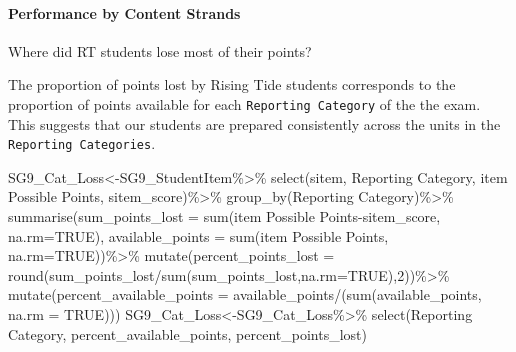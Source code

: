 \documentclass[
  letterpaper,
  DIV=11,
  numbers=noendperiod]{scrartcl}
\let\oldparagraph\paragraph
\renewcommand{\paragraph}[1]{\oldparagraph{#1}\mbox{}}
\newenvironment{Shaded}{\begin{snugshade}}{\end{snugshade}}
\newcommand{\AttributeTok}[1]{\textcolor[rgb]{0.40,0.45,0.13}{#1}}
\newcommand{\ConstantTok}[1]{\textcolor[rgb]{0.56,0.35,0.01}{#1}}
\newcommand{\DecValTok}[1]{\textcolor[rgb]{0.68,0.00,0.00}{#1}}
\newcommand{\FunctionTok}[1]{\textcolor[rgb]{0.28,0.35,0.67}{#1}}
\newcommand{\NormalTok}[1]{\textcolor[rgb]{0.00,0.23,0.31}{#1}}
\newcommand{\OtherTok}[1]{\textcolor[rgb]{0.00,0.23,0.31}{#1}}
\newcommand{\SpecialCharTok}[1]{\textcolor[rgb]{0.37,0.37,0.37}{#1}}
\newcommand{\StringTok}[1]{\textcolor[rgb]{0.13,0.47,0.30}{#1}}
\begin{document}
\hypertarget{performance-by-content-strands}{%
\paragraph{Performance by Content
Strands}\label{performance-by-content-strands}}

Where did RT students lose most of their points?

The proportion of points lost by Rising Tide students corresponds to the
proportion of points available for each \texttt{Reporting\ Category} of
the the exam. This suggests that our students are prepared consistently
across the units in the \texttt{Reporting\ Categories}.

\begin{Shaded}
\begin{Highlighting}[]
\NormalTok{SG9\_Cat\_Loss}\OtherTok{\textless{}{-}}\NormalTok{SG9\_StudentItem}\SpecialCharTok{\%\textgreater{}\%}
  \FunctionTok{select}\NormalTok{(}\StringTok{\textasciigrave{}}\AttributeTok{sitem}\StringTok{\textasciigrave{}}\NormalTok{, }\StringTok{\textasciigrave{}}\AttributeTok{Reporting Category}\StringTok{\textasciigrave{}}\NormalTok{, }\StringTok{\textasciigrave{}}\AttributeTok{item Possible Points}\StringTok{\textasciigrave{}}\NormalTok{, }\StringTok{\textasciigrave{}}\AttributeTok{sitem\_score}\StringTok{\textasciigrave{}}\NormalTok{)}\SpecialCharTok{\%\textgreater{}\%}
  \FunctionTok{group\_by}\NormalTok{(}\StringTok{\textasciigrave{}}\AttributeTok{Reporting Category}\StringTok{\textasciigrave{}}\NormalTok{)}\SpecialCharTok{\%\textgreater{}\%}
  \FunctionTok{summarise}\NormalTok{(}\AttributeTok{sum\_points\_lost =} \FunctionTok{sum}\NormalTok{(}\StringTok{\textasciigrave{}}\AttributeTok{item Possible Points}\StringTok{\textasciigrave{}}\SpecialCharTok{{-}}\StringTok{\textasciigrave{}}\AttributeTok{sitem\_score}\StringTok{\textasciigrave{}}\NormalTok{, }\AttributeTok{na.rm=}\ConstantTok{TRUE}\NormalTok{),}
            \AttributeTok{available\_points =} \FunctionTok{sum}\NormalTok{(}\StringTok{\textasciigrave{}}\AttributeTok{item Possible Points}\StringTok{\textasciigrave{}}\NormalTok{, }\AttributeTok{na.rm=}\ConstantTok{TRUE}\NormalTok{))}\SpecialCharTok{\%\textgreater{}\%}
              \FunctionTok{mutate}\NormalTok{(}\AttributeTok{percent\_points\_lost =} \FunctionTok{round}\NormalTok{(sum\_points\_lost}\SpecialCharTok{/}\FunctionTok{sum}\NormalTok{(sum\_points\_lost,}\AttributeTok{na.rm=}\ConstantTok{TRUE}\NormalTok{),}\DecValTok{2}\NormalTok{))}\SpecialCharTok{\%\textgreater{}\%}
            \FunctionTok{mutate}\NormalTok{(}\AttributeTok{percent\_available\_points =}\NormalTok{ available\_points}\SpecialCharTok{/}\NormalTok{(}\FunctionTok{sum}\NormalTok{(available\_points, }\AttributeTok{na.rm =} \ConstantTok{TRUE}\NormalTok{)))}
\NormalTok{SG9\_Cat\_Loss}\OtherTok{\textless{}{-}}\NormalTok{SG9\_Cat\_Loss}\SpecialCharTok{\%\textgreater{}\%}
  \FunctionTok{select}\NormalTok{(}\StringTok{\textasciigrave{}}\AttributeTok{Reporting Category}\StringTok{\textasciigrave{}}\NormalTok{, }\StringTok{\textasciigrave{}}\AttributeTok{percent\_available\_points}\StringTok{\textasciigrave{}}\NormalTok{, }\StringTok{\textasciigrave{}}\AttributeTok{percent\_points\_lost}\StringTok{\textasciigrave{}}\NormalTok{)}


\end{Highlighting}
\end{Shaded}
\end{document}
